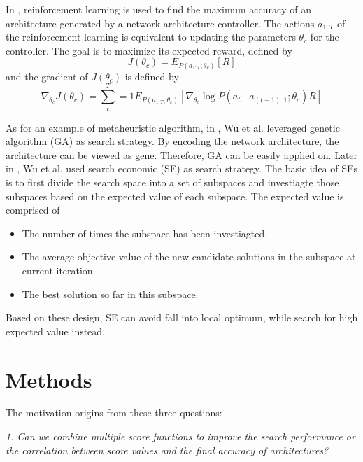 \documentclass[sigconf]{acmart}
\begin{document}
    In \cite{zoph2017neural}, reinforcement learning is used to find the maximum accuracy of an architecture 
    generated by a network architecture controller. The actions $a_{1:T}$ of the reinforcement learning is 
    equivalent to updating the parameters $\theta_c$ for the controller. The goal is to maximize 
    its expected reward, defined by 
    \begin{equation}
        \label{equ:reinforcement_rw}
        J(\theta_c)=E_{P(a_{1:T};\theta_c)}[R]
    \end{equation}
    and the gradient of $J(\theta_c)$ is defined by
    \begin{equation}
        \label{equ:reinforcement_grad}
        \nabla_{\theta_c} J(\theta_c)=\sum^T_t=1 E_{P(a_{1:T};\theta_c)}[\nabla_{\theta_c}\log P(a_t\mid a_{(t-1):1};\theta_c)R]
    \end{equation}

    As for an example of metaheuristic algorithm, in \cite{10.1145/3491396.3506510}, Wu et al. leveraged 
    genetic algorithm (GA) as search strategy. 
    By encoding the network architecture, the architecture can be viewed as gene. Therefore, GA can be 
    easily applied on. 
    Later in \cite{10092788}, Wu et al. used search economic (SE) \cite{7379579} as search strategy. The 
    basic idea of SEs is to first divide the search space into a set of subspaces and investiagte those 
    subspaces based on the expected value of each subspace. The expected value is comprised of 
    \begin{itemize}
        \item The number of times the subspace has been investiagted. 
        \item The average objective value of the new candidate solutions in the subspace at current iteration. 
        \item The best solution so far in this subspace. 
    \end{itemize}
    Based on these design, SE can avoid fall into local optimum, while search for high expected value instead. 
    
    \section{Methods}
    \label{sec:proposed}

    The motivation origins from these three questions: 

    \textit{1. Can we combine multiple score functions to improve the search performance 
    or the correlation between score values and the final accuracy of architectures?}
    
\end{document}
